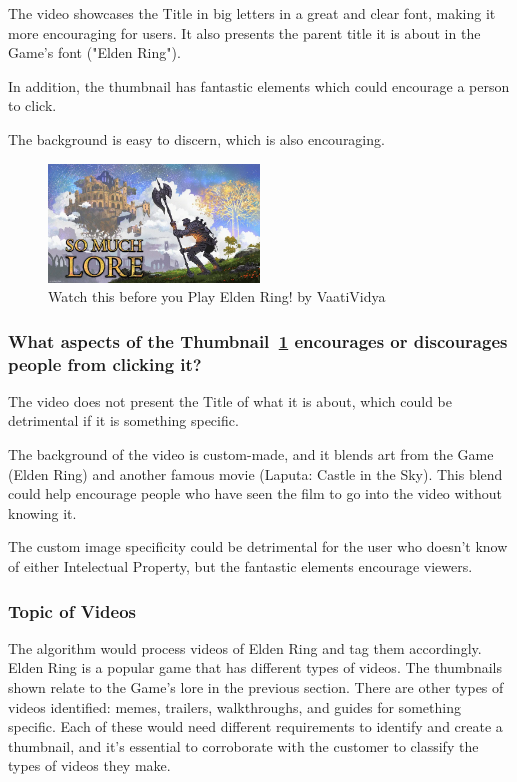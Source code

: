 \documentclass{article}
\begin{document}
The video showcases the Title in big letters in a great and clear font, making it more encouraging for users. It also presents the parent title it is about in the Game's font ("Elden Ring"). 

In addition, the thumbnail has fantastic elements which could encourage a person to click. 

The background is easy to discern, which is also encouraging. 

\begin{figure}[h!]
\centering
\includegraphics[width=0.5\textwidth]{VaatiVidya.png}
\caption{Watch this before you Play Elden Ring! by VaatiVidya}
\label{fig:thumbnail3}
\end{figure}

\subsubsection{\textbf{What aspects of the Thumbnail~\ref{fig:thumbnail3} encourages or discourages people from clicking it?}}

The video does not present the Title of what it is about, which could be detrimental if it is something specific. 

The background of the video is custom-made, and it blends art from the Game (Elden Ring) and another famous movie (Laputa: Castle in the Sky). This blend could help encourage people who have seen the film to go into the video without knowing it.

The custom image specificity could be detrimental for the user who doesn't know of either Intelectual Property, but the fantastic elements encourage viewers.
 
\subsubsection{Topic of Videos}

The algorithm would process videos of Elden Ring and tag them accordingly. Elden Ring is a popular game that has different types of videos. The thumbnails shown relate to the Game's lore in the previous section. There are other types of videos identified: memes, trailers, walkthroughs, and guides for something specific. Each of these would need different requirements to identify and create a thumbnail, and it's essential to corroborate with the customer to classify the types of videos they make. 
\end{document}
